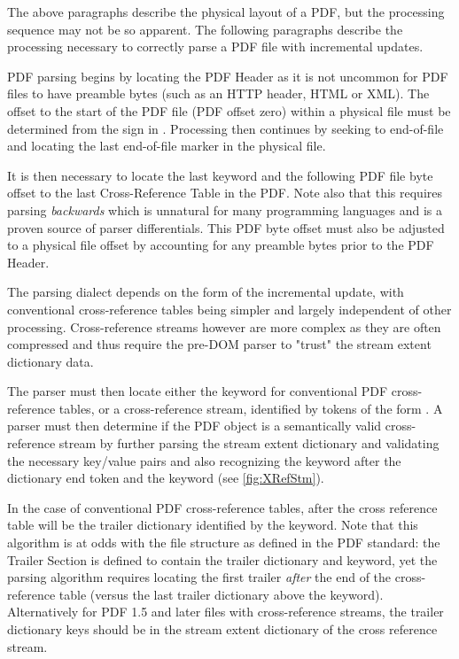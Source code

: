 The above paragraphs describe the physical layout of a PDF, but the processing sequence may not be so apparent. The following paragraphs describe the processing necessary to correctly parse a PDF file with incremental updates.

PDF parsing begins by locating the PDF Header as it is not uncommon for PDF files to have 
preamble bytes (such as an HTTP header, HTML or XML). The offset to the start of the PDF file 
(PDF offset zero)
within a physical file must be determined from the \lstcd{\%} sign in . 
Processing then continues by seeking to end-of-file and locating the last end-of-file marker  in the physical file.

It is then necessary to locate the last  keyword and the following PDF file byte offset 
to the last Cross-Reference Table in the PDF. Note also that this requires parsing \emph{backwards}
which is unnatural for many programming languages and is a proven source of parser differentials. This PDF byte offset must also be adjusted to a physical file offset by accounting for any preamble bytes prior to the PDF Header.

The parsing dialect depends on the form of the incremental update, with
conventional cross-reference tables being simpler and largely independent of
other processing. Cross-reference streams however are more complex as they are
often compressed and thus require the pre-DOM parser to "trust" the stream
extent dictionary data.

The parser must then locate either the  keyword for
conventional PDF cross-reference tables, or a cross-reference stream, identified by tokens of the form  . 
A parser must then determine if the PDF object is a
semantically valid cross-reference stream by further parsing the stream extent dictionary and 
validating the necessary key/value pairs and also recognizing the  keyword after the dictionary end token \lstcd{>>} and the  keyword (see \cref{fig:XRefStm}). 

In the case of conventional PDF
cross-reference tables, after the cross reference table will be the
trailer dictionary identified by the  keyword. 
Note that this algorithm is at
odds with the file structure as defined in the PDF standard: the Trailer Section is defined
to contain the trailer dictionary and  keyword, yet the parsing algorithm
requires locating the first trailer \emph{after} the end of the cross-reference table 
(versus the last trailer dictionary above the  keyword). 
Alternatively for PDF 1.5 and later files with cross-reference
streams, the trailer dictionary keys should be in the stream extent
dictionary of the cross reference stream. 

